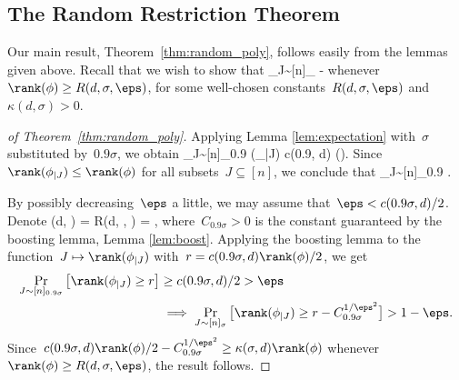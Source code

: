 \subsection{The Random Restriction Theorem}

Our main result, Theorem~\ref{thm:random_poly}, follows easily from the lemmas given above.
Recall that we wish to show that
\beqn
\Pr_{J\sim [n]_{\sigma}}  - \eps
\eeqn
whenever~$\rank(\phi) \geq R(d, \sigma, \eps)$, for some well-chosen constants~$R(d, \sigma, \eps)$ and $\kappa(d, \sigma) > 0$.

\begin{proof}[ of Theorem~\ref{thm:random_poly}]
Applying Lemma \ref{lem:expectation} with~$\sigma$ substituted by~$0.9\sigma$, we obtain
\beqn
\Exp_{J\sim [n]_{0.9\sigma}} \rank(\phi_{|J}) \geq c(0.9\sigma, d) \rank(\phi).
\eeqn
Since~$\rank(\phi_{|J}) \leq \rank(\phi)$ for all subsets~$J \subseteq [n]$, we conclude that
\beqn
\Pr_{J\sim [n]_{0.9\sigma}}  \geq {}.
\eeqn

By possibly decreasing~$\eps$ a little, we may assume that~$\eps < c(0.9\sigma, d)/2$.
Denote
\beqn
\kappa(d, \sigma) =  \quad {} \quad R(d, \sigma, \eps) = ,
\eeqn
where~$C_{0.9\sigma} > 0$ is the constant guaranteed by the boosting lemma, Lemma \ref{lem:boost}.
Applying the boosting lemma to the function~$J \mapsto \rank(\phi_{|J})$ with~$r = c(0.9\sigma, d) \rank(\phi)/2$, we get
\begin{align*}
    \Pr_{J\sim [n]_{0.9\sigma}} \big[ \rank(\phi_{|J}) \geq r \big] &\geq c(0.9\sigma, d)/2 > \eps \\
    &\implies \Pr_{J\sim [n]_{\sigma}} \big[ \rank(\phi_{|J}) \geq r - C_{0.9\sigma}^{1/\eps^2} \big] > 1-\eps.
\end{align*}
Since~$c(0.9\sigma, d) \rank(\phi)/2 - C_{0.9\sigma}^{1/\eps^2} \geq \kappa(\sigma, d) \rank(\phi)$ whenever $\rank(\phi) \geq R(d, \sigma, \eps)$, the result follows.
\end{proof}
